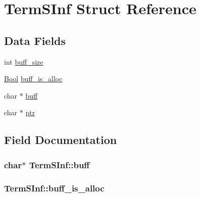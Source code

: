\hypertarget{structTermSInf}{}\section{Term\+S\+Inf Struct Reference}
\label{structTermSInf}
\subsection*{Data Fields}
\begin{DoxyCompactItemize}
\item 
int \hyperlink{structTermSInf_aa2ac007b499e0cb03e17072299872d08}{buff\+\_\+size}
\item 
\hyperlink{bool_8h_afdcfe6db5bea87bd493a3fe2c513d5ef}{Bool} \hyperlink{structTermSInf_a02d37582809df8e6a18bf4cdcb598693}{buff\+\_\+is\+\_\+alloc}
\item 
char $\ast$ \hyperlink{structTermSInf_aea3421d8fe398941f9280da64bcfba35}{buff}
\item 
char $\ast$ \hyperlink{structTermSInf_a46ab1bf8caba7bd0044429601be6b670}{ptr}
\end{DoxyCompactItemize}


\subsection{Field Documentation}
\subsubsection[{\texorpdfstring{buff}{buff}}]{\setlength{\rightskip}{0pt plus 5cm}char$\ast$ Term\+S\+Inf\+::buff}\hypertarget{structTermSInf_aea3421d8fe398941f9280da64bcfba35}{}\label{structTermSInf_aea3421d8fe398941f9280da64bcfba35}
\subsubsection[{\texorpdfstring{buff\+\_\+is\+\_\+alloc}{buff_is_alloc}}]{ Term\+S\+Inf\+::buff\+\_\+is\+\_\+alloc}\hypertarget{structTermSInf_a02d37582809df8e6a18bf4cdcb598693}{}\label{structTermSInf_a02d37582809df8e6a18bf4cdcb598693}
